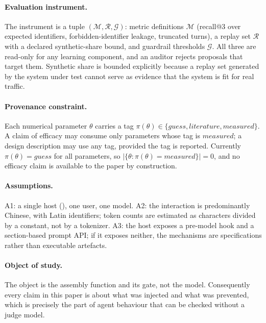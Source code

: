 \paragraph{Evaluation instrument.} The instrument is a tuple
$(\mathcal{M}, \mathcal{R}, \mathcal{G})$: metric definitions $\mathcal{M}$
(recall@3 over expected identifiers, forbidden-identifier leakage, truncated
turns), a replay set $\mathcal{R}$ with a declared synthetic-share bound, and
guardrail thresholds $\mathcal{G}$. All three are read-only for any learning
component, and an auditor rejects proposals that target them. Synthetic share
is bounded explicitly because a replay set generated by the system under test
cannot serve as evidence that the system is fit for real traffic.

\paragraph{Provenance constraint.} Each numerical parameter $\theta$ carries a
tag $\pi(\theta) \in \{\mathit{guess}, \mathit{literature},
\mathit{measured}\}$. A claim of efficacy may consume only parameters whose tag
is $\mathit{measured}$; a design description may use any tag, provided the tag is
reported. Currently $\pi(\theta) = \mathit{guess}$ for all parameters, so
$|\{\theta : \pi(\theta) = \mathit{measured}\}| = 0$, and no efficacy claim is
available to the paper by construction.

\paragraph{Assumptions.} A1: a single host (\host{}), one user, one model. A2:
the interaction is predominantly Chinese, with Latin identifiers; token counts
are estimated as characters divided by a constant, not by a tokenizer. A3: the
host exposes a pre-model hook and a section-based prompt API; if it exposes
neither, the mechanisms are specifications rather than executable artefacts.

\paragraph{Object of study.} The object is the assembly function and its gate,
not the model. Consequently every claim in this paper is about what was injected
and what was prevented, which is precisely the part of agent behaviour that can
be checked without a judge model.
